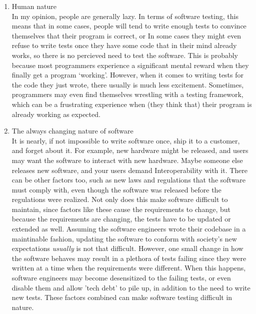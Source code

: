 \documentclass[letterpaper]{article}
\begin{document}
\begin{enumerate}
	\item Human nature\\
	      In my opinion, people are generally lazy. In terms of software testing, this means that in some cases,
	      people will tend to write enough tests to convince themselves that their program is correct, or
	      In some cases they might even refuse to write tests once they have some code that in their mind already works,
	      so there is no percieved need to test the software.
	      This is probably because most programmers experience a significant mental reward when they finally get a program `working'.
	      However, when it comes to writing tests for the code they just wrote, there usually is much less excitement.
	      Sometimes, programmers may even find themselves wrestling with a testing framework, which can be a frustrating experience when (they think that)
	      their program is already working as expected.

	\item The always changing nature of software\\
	      It is nearly, if not impossible to write software once, ship it to a customer, and forget about it.
	      For example, new hardware might be released, and users may want the software to interact with new hardware.
	      Maybe someone else releases new software, and your users demand Interoperability with it.
	      There can be other factors too, such as new laws and regulations that the software must comply with,
	      even though the software was released before the regulations were realized. Not only does this make
	      software difficult to maintain, since factors like these cause the requirements to change, but because the
	      requirements are changing, the tests have to be updated or extended as well.
	      Assuming the software engineers wrote their codebase in a maintinable fashion, updating the software
	      to conform with society's new expectations \textit{usually} is not that difficult. However, one small change
	      in how the software behaves may result in a plethora of tests failing since they were written at a time
	      when the requirements were different.
	      When this happens, software engineers may become desensitized to the failing tests, or even disable them
	      and allow 'tech debt' to pile up, in addition to the need to write new tests. These factors combined can make
	      software testing difficult in nature.
\end{enumerate}
\end{document}
